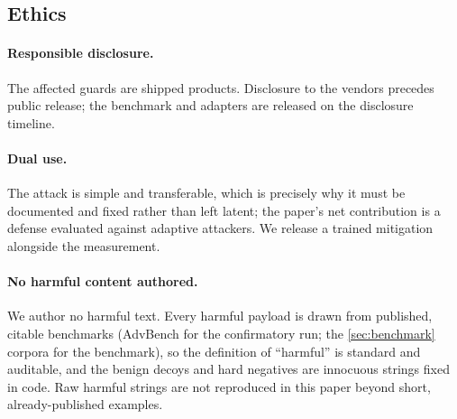 \subsection{Ethics}

\paragraph{Responsible disclosure.}
The affected guards are shipped products.
Disclosure to the vendors precedes public release; the benchmark and adapters are released on the disclosure timeline.

\paragraph{Dual use.}
The attack is simple and transferable, which is precisely why it must be documented and fixed rather than left latent; the paper's net contribution is a defense evaluated against adaptive attackers.
We release a trained mitigation alongside the measurement.

\paragraph{No harmful content authored.}
We author no harmful text.
Every harmful payload is drawn from published, citable benchmarks (AdvBench for the confirmatory run; the \cref{sec:benchmark} corpora for the benchmark), so the definition of ``harmful'' is standard and auditable, and the benign decoys and hard negatives are innocuous strings fixed in code.
Raw harmful strings are not reproduced in this paper beyond short, already-published examples.
